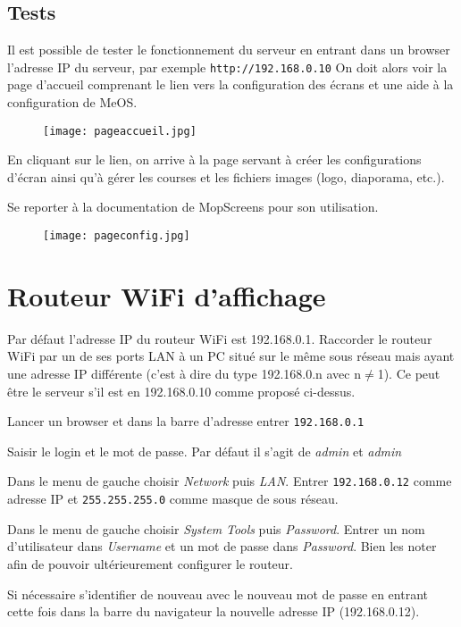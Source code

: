 \documentclass[a4paper]{ffco-rapport}
\begin{document}
\section{Tests}
	Il est possible de tester le fonctionnement du serveur en entrant dans un browser l'adresse IP du serveur, par exemple \verb|http://192.168.0.10| On doit alors voir la page d'accueil comprenant le lien vers la configuration des écrans et une aide à la configuration de MeOS.
	
\begin{figure}[!ht]
	\centering
		\texttt{[image: pageaccueil.jpg]}
	\label{fig:b}
\end{figure}

En cliquant sur le lien, on arrive à la page servant à créer les configurations d'écran ainsi qu'à gérer les courses et les fichiers images (logo, diaporama, etc.).

Se reporter à la documentation de MopScreens pour son utilisation.

\begin{figure}[!ht]
	\centering
		\texttt{[image: pageconfig.jpg]}
	\label{fig:c}
\end{figure}

\chapter{Routeur WiFi d'affichage}
	
	Par défaut l'adresse IP du routeur WiFi est 192.168.0.1.
	Raccorder le routeur WiFi par un de ses ports LAN à un PC situé sur le même sous réseau mais ayant une adresse IP différente (c'est à dire du type 192.168.0.n avec n$\neq$1).
	Ce peut être le serveur s'il est en 192.168.0.10 comme proposé ci-dessus.
	
	Lancer un browser et dans la barre d'adresse entrer \verb|192.168.0.1|
	
	Saisir le login et le mot de passe. Par défaut il s'agit de \emph{admin} et \emph{admin}
	
	Dans le menu de gauche choisir \emph{Network} puis \emph{LAN}. Entrer \texttt{192.168.0.12} comme adresse IP et \texttt{255.255.255.0} comme masque de sous réseau.

	Dans le menu de gauche choisir \emph{System Tools} puis \emph{Password}. Entrer un nom d'utilisateur dans \emph{Username} et un mot de passe dans \emph{Password}.
	Bien les noter afin de pouvoir ultérieurement configurer le routeur.
	
	Si nécessaire s'identifier de nouveau avec le nouveau mot de passe en entrant cette fois dans la barre du navigateur la nouvelle adresse IP (192.168.0.12).
	
\end{document}
